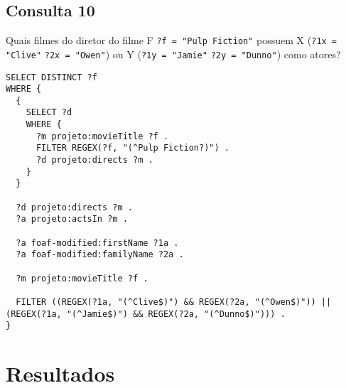 \documentclass{article}
\newcommand{\code}[1]{\lstinline[mathescape=true]{#1}}
\begin{document}
\subsection{Consulta 10}
Quais filmes do diretor do filme F \code{?f = "Pulp Fiction"} possuem X (\code{?1x = "Clive"} \code{?2x = "Owen"}) ou Y (\code{?1y = "Jamie"} \code{?2y = "Dunno"}) como atores?

\begin{lstlisting}[basicstyle=\ttfamily,frame=single]
SELECT DISTINCT ?f
WHERE {
  {
    SELECT ?d
    WHERE {
      ?m projeto:movieTitle ?f .
      FILTER REGEX(?f, "(^Pulp Fiction?)") .
      ?d projeto:directs ?m .
    }
  }

  ?d projeto:directs ?m .
  ?a projeto:actsIn ?m .

  ?a foaf-modified:firstName ?1a .
  ?a foaf-modified:familyName ?2a .
   
  ?m projeto:movieTitle ?f .

  FILTER ((REGEX(?1a, "(^Clive$)") && REGEX(?2a, "(^Owen$)")) || (REGEX(?1a, "(^Jamie$)") && REGEX(?2a, "(^Dunno$)"))) .
}
\end{lstlisting}

\section{Resultados}

\end{document}
